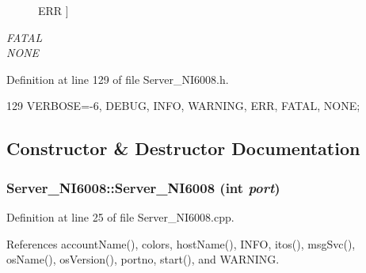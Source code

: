 \begin{Desc}
\begin{description}
{{ERR}
\label{classServer__NI6008_af1e3e3bac26355a746b5d2e548fe25bea23728be8768fe4c119fb61ad427ed5ba}
}]\item[{\em 
\hypertarget{classServer__NI6008_af1e3e3bac26355a746b5d2e548fe25bea678aa96ea2189f7d6ab602160fa49b8b}{
FATAL}
\label{classServer__NI6008_af1e3e3bac26355a746b5d2e548fe25bea678aa96ea2189f7d6ab602160fa49b8b}
}]\item[{\em 
\hypertarget{classServer__NI6008_af1e3e3bac26355a746b5d2e548fe25bea26813832bb3e07669c3f2e68e2b9690e}{
NONE}
\label{classServer__NI6008_af1e3e3bac26355a746b5d2e548fe25bea26813832bb3e07669c3f2e68e2b9690e}
}]\end{description}
\end{Desc}



Definition at line 129 of file Server\_\-NI6008.h.


\begin{DoxyCode}
129 {VERBOSE=-6, DEBUG, INFO, WARNING, ERR, FATAL, NONE};
\end{DoxyCode}


\subsection{Constructor \& Destructor Documentation}
\hypertarget{classServer__NI6008_afdb7ded0c7463c53829529aa9864c9da}{
\subsubsection[{Server\_\-NI6008}]{\setlength{\rightskip}{0pt plus 5cm}Server\_\-NI6008::Server\_\-NI6008 (int {\em port})}}
\label{classServer__NI6008_afdb7ded0c7463c53829529aa9864c9da}


Definition at line 25 of file Server\_\-NI6008.cpp.

References accountName(), colors, hostName(), INFO, itos(), msgSvc(), osName(), osVersion(), portno, start(), and WARNING.


